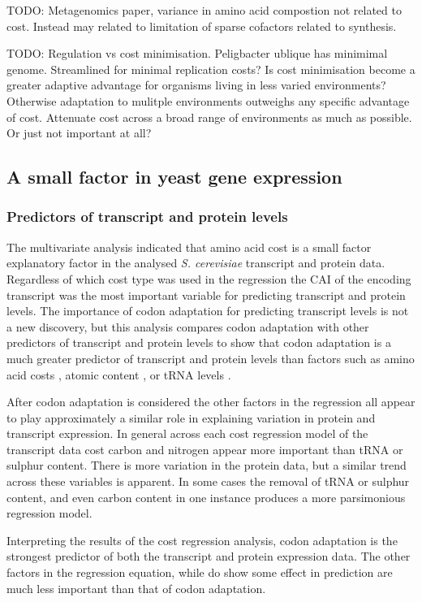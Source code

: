 TODO: Metagenomics paper, variance in amino acid compostion not related to cost. Instead may related to limitation of sparse cofactors related to synthesis.

TODO: Regulation vs cost minimisation. Peligbacter ublique has minimimal genome. Streamlined for minimal replication costs? Is cost minimisation become a greater adaptive advantage for organisms living in less varied environments? Otherwise adaptation to mulitple environments outweighs any specific advantage of cost. Attenuate cost across a broad range of environments as much as possible. Or just not important at all?

\subsection{A small factor in yeast gene expression}

\subsubsection{Predictors of transcript and protein levels}

The multivariate analysis indicated that amino acid cost is a small factor explanatory factor in the analysed \emph{S. cerevisiae} transcript and protein data. Regardless of which cost type was used in the regression the CAI of the encoding transcript was the most important variable for predicting transcript and protein levels. The importance of codon adaptation for predicting transcript levels is not a new discovery, but this analysis compares codon adaptation with other predictors of transcript and protein levels to show that codon adaptation is a much greater predictor of transcript and protein levels than factors such as amino acid costs \cite{akashi2002}, atomic content \cite{atomic_content}, or tRNA levels \cite{akashi_trna}.

After codon adaptation is considered the other factors in the regression all appear to play approximately a similar role in explaining variation in protein and transcript expression. In general across each cost regression model of the transcript data cost carbon and nitrogen appear more important than tRNA or sulphur content. There is more variation in the protein data, but a similar trend across these variables is apparent. In some cases the removal of tRNA or sulphur content, and even carbon content in one instance produces a more parsimonious regression model. 

Interpreting the results of the cost regression analysis, codon adaptation is the strongest predictor of both the transcript and protein expression data. The other factors in the regression equation, while do show some effect in prediction are much less important than that of codon adaptation.

